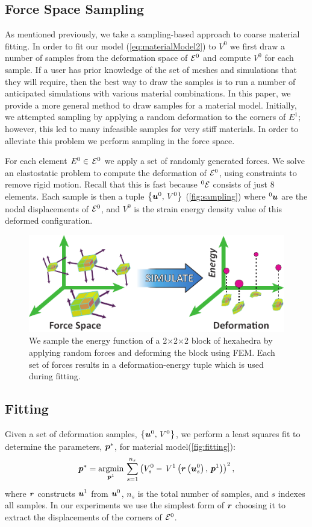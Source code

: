 \subsection{Force Space Sampling}
\label{sec:force_space_sampling}
As mentioned previously, we take a sampling-based approach to coarse material fitting. In order to fit our model (\autoref{eq:materialModel2}) to $V^0$ we first draw a number of samples from the deformation space of $\mathcal{E}^0$ and compute $V^0$ for each sample.
If a user has prior knowledge of the set of meshes and simulations that they will require, then the best way to draw the samples is to run a number of anticipated simulations with various material combinations.
In this paper, we provide a more general method to draw samples for a material model.
Initially, we attempted sampling by applying a random deformation to the corners of $\mathit{E}^1$; however, this led to many infeasible samples for very stiff materials.
In order to alleviate this problem we perform sampling in the force space.

For each element $\mathit{E}^0\in \, \mathcal{E}^0$ we apply a set of randomly generated forces.
We solve an elastostatic problem to compute the deformation of $\mathcal{E}^0$, using constraints to remove rigid motion. Recall that this is fast because $^0\mathcal{E}$ consists of just 8 elements.
Each sample is then a tuple $\left\{\bm{u}^0, \, V^0\right\}$ (\autoref{fig:sampling}) 
where $^0\bm{u}$ are the nodal displacements of $\mathcal{E}^0$,
and $V^0$ is the strain energy density value of this deformed configuration.
\begin{figure}
	\centering
	\includegraphics[width=0.6\columnwidth]{images/sampling.pdf}
	\caption{ We sample the energy function of a 2$\times$2$\times$2 block of hexahedra by applying random forces and deforming the block using FEM. Each set of forces results in a deformation-energy tuple which is used during fitting.}
	\label{fig:sampling}
\end{figure}

\subsection{Fitting}
\label{sec:fitting}
Given a set of deformation samples, $\left\{ \bm{u}^0, \,V^0\right\}$, we perform a least squares fit to determine the parameters, $\bm{p}^*$, for material model(\autoref{fig:fitting}):
\begin{align}
\bm{p}^*= \underset{\bm{p}^1}{\operatorname{argmin}} \, \sum_{s=1}^{n_s}\left(V_s^0- \, V^1\left(\bm{r}\left(\bm{u}_s^0\right), \, \bm{p}^1\right)\right)^2,
\label{eq:fitting}
\end{align}
where $\bm{r}$ constructs $\bm{u}^1$ from $\bm{u}^0$, $n_s$ is the total number of samples, and $s$ indexes all samples. In our experiments we use the simplest form of $\bm{r}$ choosing it to extract the displacements of the corners of $\mathcal{E}^0$.

